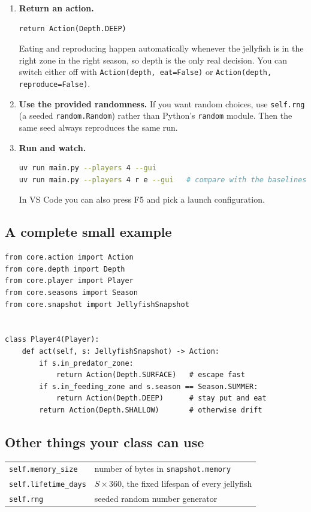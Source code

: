 \documentclass[11pt]{article}
\begin{document}
\begin{enumerate}[leftmargin=*]
  \item \textbf{Return an action.}
\begin{lstlisting}
return Action(Depth.DEEP)
\end{lstlisting}
  Eating and reproducing happen automatically whenever the jellyfish is in
  the right zone in the right season, so depth is the only real decision.
  You can switch either off with \texttt{Action(depth, eat=False)} or
  \texttt{Action(depth, reproduce=False)}.

  \item \textbf{Use the provided randomness.} If you want random choices,
  use \texttt{self.rng} (a seeded \texttt{random.Random}) rather than
  Python's \texttt{random} module. Then the same seed always reproduces
  the same run.

  \item \textbf{Run and watch.}
\begin{lstlisting}[language=bash]
uv run main.py --players 4 --gui
uv run main.py --players 4 r e --gui   # compare with the baselines
\end{lstlisting}
  In VS Code you can also press F5 and pick a launch configuration.
\end{enumerate}

\subsection{A complete small example}

\begin{lstlisting}
from core.action import Action
from core.depth import Depth
from core.player import Player
from core.seasons import Season
from core.snapshot import JellyfishSnapshot


class Player4(Player):
    def act(self, s: JellyfishSnapshot) -> Action:
        if s.in_predator_zone:
            return Action(Depth.SURFACE)   # escape fast
        if s.in_feeding_zone and s.season == Season.SUMMER:
            return Action(Depth.DEEP)      # stay put and eat
        return Action(Depth.SHALLOW)       # otherwise drift
\end{lstlisting}

\subsection{Other things your class can use}

\begin{tabular}{@{}ll@{}}
\toprule
\texttt{self.memory\_size}   & number of bytes in \texttt{snapshot.memory} \\
\texttt{self.lifetime\_days} & $S \times 360$, the fixed lifespan of every jellyfish \\
\texttt{self.rng}            & seeded random number generator \\
\bottomrule
\end{tabular}
\end{document}
